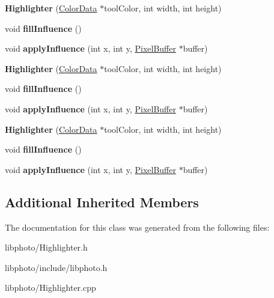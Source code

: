 \begin{DoxyCompactItemize}
\item 
\hypertarget{classHighlighter_aec9c28167c01f98e3da6eb38e64e6c67}{{\bfseries Highlighter} (\hyperlink{classColorData}{Color\-Data} $\ast$tool\-Color, int width, int height)}\label{classHighlighter_aec9c28167c01f98e3da6eb38e64e6c67}

\item 
\hypertarget{classHighlighter_ab2d858cc3fbddace3f64688293cad8e1}{void {\bfseries fill\-Influence} ()}\label{classHighlighter_ab2d858cc3fbddace3f64688293cad8e1}

\item 
\hypertarget{classHighlighter_a28e750d99d9aa85521427001ef73be0d}{void {\bfseries apply\-Influence} (int x, int y, \hyperlink{classPixelBuffer}{Pixel\-Buffer} $\ast$buffer)}\label{classHighlighter_a28e750d99d9aa85521427001ef73be0d}

\item 
\hypertarget{classHighlighter_aec9c28167c01f98e3da6eb38e64e6c67}{{\bfseries Highlighter} (\hyperlink{classColorData}{Color\-Data} $\ast$tool\-Color, int width, int height)}\label{classHighlighter_aec9c28167c01f98e3da6eb38e64e6c67}

\item 
\hypertarget{classHighlighter_ab2d858cc3fbddace3f64688293cad8e1}{void {\bfseries fill\-Influence} ()}\label{classHighlighter_ab2d858cc3fbddace3f64688293cad8e1}

\item 
\hypertarget{classHighlighter_a28e750d99d9aa85521427001ef73be0d}{void {\bfseries apply\-Influence} (int x, int y, \hyperlink{classPixelBuffer}{Pixel\-Buffer} $\ast$buffer)}\label{classHighlighter_a28e750d99d9aa85521427001ef73be0d}

\item 
\hypertarget{classHighlighter_aec9c28167c01f98e3da6eb38e64e6c67}{{\bfseries Highlighter} (\hyperlink{classColorData}{Color\-Data} $\ast$tool\-Color, int width, int height)}\label{classHighlighter_aec9c28167c01f98e3da6eb38e64e6c67}

\item 
\hypertarget{classHighlighter_ab2d858cc3fbddace3f64688293cad8e1}{void {\bfseries fill\-Influence} ()}\label{classHighlighter_ab2d858cc3fbddace3f64688293cad8e1}

\item 
\hypertarget{classHighlighter_a28e750d99d9aa85521427001ef73be0d}{void {\bfseries apply\-Influence} (int x, int y, \hyperlink{classPixelBuffer}{Pixel\-Buffer} $\ast$buffer)}\label{classHighlighter_a28e750d99d9aa85521427001ef73be0d}

\end{DoxyCompactItemize}
\subsection*{Additional Inherited Members}


The documentation for this class was generated from the following files\-:\begin{DoxyCompactItemize}
\item 
libphoto/Highlighter.\-h\item 
libphoto/include/libphoto.\-h\item 
libphoto/Highlighter.\-cpp\end{DoxyCompactItemize}
